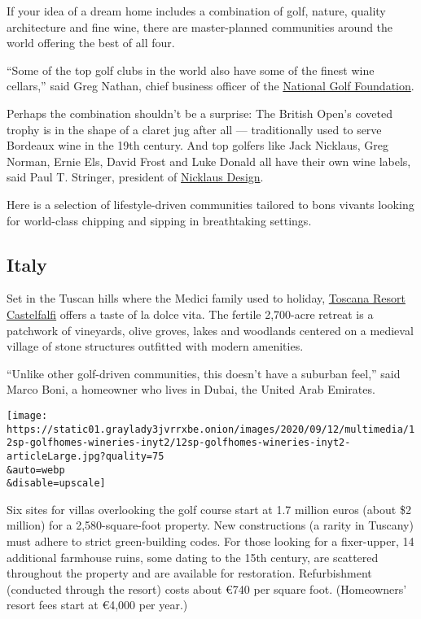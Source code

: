 If your idea of a dream home includes a combination of golf, nature,
quality architecture and fine wine, there are master-planned communities
around the world offering the best of all four.

``Some of the top golf clubs in the world also have some of the finest
wine cellars,'' said Greg Nathan, chief business officer of the
\href{https://www.ngf.org/}{National Golf Foundation}.

Perhaps the combination shouldn't be a surprise: The British Open's
coveted trophy is in the shape of a claret jug after all ---
traditionally used to serve Bordeaux wine in the 19th century. And top
golfers like Jack Nicklaus, Greg Norman, Ernie Els, David Frost and Luke
Donald all have their own wine labels, said Paul T. Stringer, president
of \href{https://www.nicklausdesign.com/}{Nicklaus Design}.

Here is a selection of lifestyle-driven communities tailored to bons
vivants looking for world-class chipping and sipping in breathtaking
settings.

\hypertarget{italy}{%
\subsection{Italy}\label{italy}}

Set in the Tuscan hills where the Medici family used to holiday,
\href{https://www.castelfalfi.com/}{Toscana Resort Castelfalfi} offers a
taste of la dolce vita. The fertile 2,700-acre retreat is a patchwork of
vineyards, olive groves, lakes and woodlands centered on a medieval
village of stone structures outfitted with modern amenities.

``Unlike other golf-driven communities, this doesn't have a suburban
feel,'' said Marco Boni, a homeowner who lives in Dubai, the United Arab
Emirates.

\texttt{[image: https://static01.graylady3jvrrxbe.onion/images/2020/09/12/multimedia/12sp-golfhomes-wineries-inyt2/12sp-golfhomes-wineries-inyt2-articleLarge.jpg?quality=75\\\&auto=webp\\\&disable=upscale]}

Six sites for villas overlooking the golf course start at 1.7 million
euros (about \$2 million) for a 2,580-square-foot property. New
constructions (a rarity in Tuscany) must adhere to strict green-building
codes. For those looking for a fixer-upper, 14 additional farmhouse
ruins, some dating to the 15th century, are scattered throughout the
property and are available for restoration. Refurbishment (conducted
through the resort) costs about €740 per square foot. (Homeowners'
resort fees start at €4,000 per year.)

